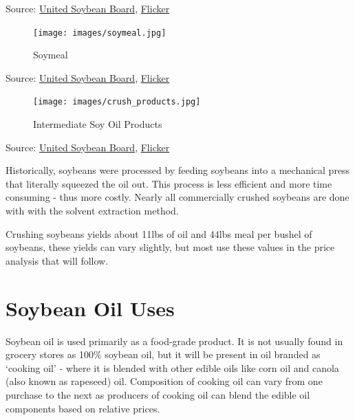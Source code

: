 \documentclass[
  letterpaper,
  DIV=11,
  numbers=noendperiod]{scrreprt}
\begin{document}
Source: \href{http://unitedsoybean.org/}{United Soybean Board},
\href{https://www.flickr.com/photos/unitedsoybean/10059015936/}{Flicker}

\begin{figure}[H]

{\centering \texttt{[image: images/soymeal.jpg]}

}

\caption{Soymeal}

\end{figure}%

Source: \href{http://unitedsoybean.org/}{United Soybean Board},
\href{https://www.flickr.com/photos/unitedsoybean/10059074033/}{Flicker}

\begin{figure}[H]

{\centering \texttt{[image: images/crush\_products.jpg]}

}

\caption{Intermediate Soy Oil Products}

\end{figure}%

Source: \href{http://unitedsoybean.org/}{United Soybean Board},
\href{https://www.flickr.com/photos/unitedsoybean/10058954054/}{Flicker}

Historically, soybeans were processed by feeding soybeans into a
mechanical press that literally squeezed the oil out. This process is
less efficient and more time consuming - thus more costly. Nearly all
commercially crushed soybeans are done with with the solvent extraction
method.

Crushing soybeans yields about 11lbs of oil and 44lbs meal per bushel of
soybeans, these yields can vary slightly, but most use these values in
the price analysis that will follow.

\section{Soybean Oil Uses}\label{soybean-oil-uses}

Soybean oil is used primarily as a food-grade product. It is not usually
found in grocery stores as 100\% soybean oil, but it will be present in
oil branded as `cooking oil' - where it is blended with other edible
oils like corn oil and canola (also known as rapeseed) oil. Composition
of cooking oil can vary from one purchase to the next as producers of
cooking oil can blend the edible oil components based on relative
prices.
\end{document}
